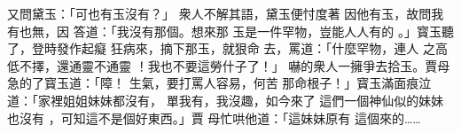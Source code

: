 \documentclass[森,便箋]{genkou}
\begin{document}
\par \utmin
又問黛玉：「可也有玉沒有？」
衆人不解其語，黛玉便忖度著
因他有玉，故問我有也無，因
答道：「我沒有那個。想來那
玉是一件罕物，豈能人人有的
。」寳玉聽了，登時發作起癡
狂病來，摘下那玉，就狠命
去，罵道：「什麼罕物，連人
之高低不擇，還通靈不通靈
！我也不要這勞什子了！」
嚇的衆人一擁爭去拾玉。賈母
急的了寳玉道：「障！
生氣，要打罵人容易，何苦
那命根子！」寳玉滿面痕泣
道：「家裡姐姐妹妹都沒有，
單我有，我沒趣，如今來了
這們一個神仙似的妹妹也沒有
，可知這不是個好東西。」賈
母忙哄他道：「這妹妹原有
這個來的……
\end{document}
